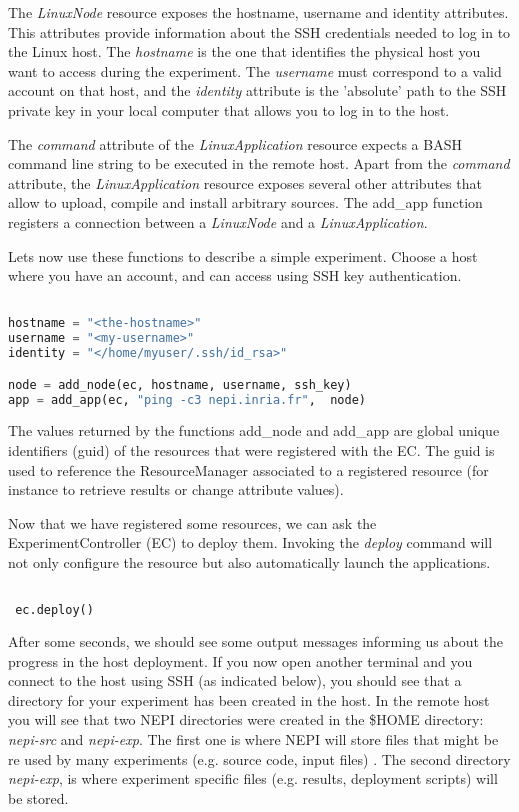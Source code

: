 The \textit{LinuxNode} resource exposes the hostname, username and identity 
attributes. This attributes provide information about the SSH credentials 
needed to log in to the Linux host. 
The \textit{hostname} is the one that identifies the physical host you want
to access during the experiment. The \textit{username} must correspond to a
valid account on that host, and the \textit{identity} attribute is the 
'absolute' path to the SSH private key in your local computer that allows you 
to log in to the host.

The \textit{command} attribute of the \textit{LinuxApplication} resource 
expects a BASH command line string to be executed in the remote host.
Apart from the \emph{command} attribute, the \emph{LinuxApplication} 
resource exposes several other attributes that allow to upload, 
compile and install arbitrary sources. 
The add\_app function registers a connection between a \textit{LinuxNode} and a 
\textit{LinuxApplication}. 

Lets now use these functions to describe a simple experiment. 
Choose a host where you have an account, and can access using SSH
key authentication. 

\begin{lstlisting}[language=Python]

hostname = "<the-hostname>"
username = "<my-username>"
identity = "</home/myuser/.ssh/id_rsa>"

node = add_node(ec, hostname, username, ssh_key)
app = add_app(ec, "ping -c3 nepi.inria.fr",  node)

\end{lstlisting}

The values returned by the functions add\_node and add\_app are global 
unique identifiers (guid) of the resources that were registered with the EC. 
The guid is used to reference the ResourceManager associated to a registered
resource (for instance to retrieve results or change attribute values).

Now that we have registered some resources, we can ask the ExperimentController
(EC) to deploy them. 
Invoking the \emph{deploy} command will not only configure the 
resource but also automatically launch the applications.

\begin{lstlisting}[language=Python]

 ec.deploy()

\end{lstlisting}

After some seconds, we should see some output messages informing us about the
progress in the host deployment.
If you now open another terminal and you connect to the host using 
SSH (as indicated below), you should see that a directory for your experiment 
has been created in the host. In the remote host you will see that two NEPI 
directories were created in the \$HOME directory: \emph{nepi-src} and \emph{nepi-exp}. 
The first one is where NEPI will store files that might be re used by many 
experiments (e.g. source code, input files) . The second directory \emph{nepi-exp}, 
is where experiment specific files (e.g. results, deployment scripts) will be stored. 

